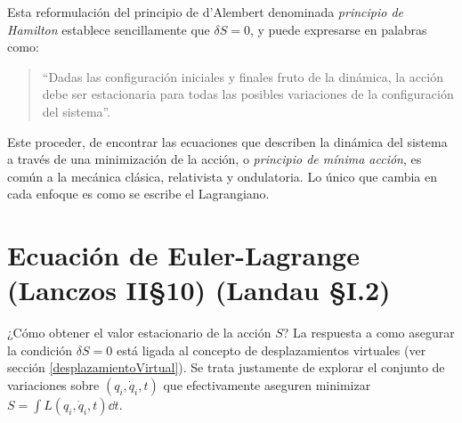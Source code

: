 \documentclass[12pt,spanish,a4paper]{article}
\begin{document}
Esta reformulación del principio de d'Alembert denominada \emph{principio de Hamilton} establece sencillamente que \(\delta S= 0\), y puede expresarse en palabras como:
\begin{quote}
``Dadas las configuración iniciales y finales fruto de la dinámica, la acción debe ser estacionaria para todas las posibles variaciones de la configuración del sistema''. 
\end{quote}

Este proceder, de encontrar las ecuaciones que describen la dinámica del sistema a través de una minimización de la acción, o \emph{principio de mínima acción}, es común a la mecánica clásica, relativista y ondulatoria.
Lo único que cambia en cada enfoque es como se escribe el Lagrangiano.


\section{Ecuación de Euler-Lagrange {\small (Lanczos II\S10) (Landau \S I.2)} }\label{EulerLagrange} %
¿Cómo obtener el valor estacionario de la acción \(S\)?
La respuesta a como asegurar la condición \(\delta S= 0\) está ligada al concepto de desplazamientos virtuales (ver sección \ref{desplazamientoVirtual}).
Se trata justamente de explorar el conjunto de variaciones sobre \((q_i, \dot{q}_i, t)\) que efectivamente aseguren minimizar \(S= \int L(q_i, \dot{q}_i, t) \dd t\).
\end{document}
